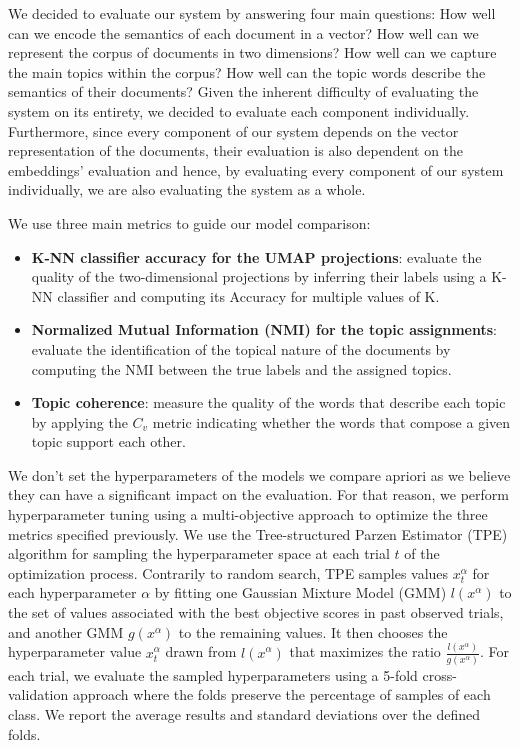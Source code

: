 \documentclass[a4paper]{article}
\begin{document}
We decided to evaluate our system by answering four main questions: How well can we encode the semantics of each document in a vector? How well can we represent the corpus of documents in two dimensions? How well can we capture the main topics within the corpus? How well can the topic words describe the semantics of their documents?
Given the inherent difficulty of evaluating the system on its entirety, we decided to evaluate each component individually. Furthermore, since every component of our system depends on the vector representation of the documents, their evaluation is also dependent on the embeddings' evaluation and hence, by evaluating every component of our system individually, we are also evaluating the system as a whole.

We use three main metrics to guide our model comparison: 
\begin{itemize}
  \item \textbf{K-NN classifier accuracy for the UMAP projections}: evaluate the quality of the two-dimensional projections by inferring their labels using a K-NN classifier and computing its Accuracy for multiple values of K.
  \item \textbf{Normalized Mutual Information (NMI) for the topic assignments}: evaluate the identification of the topical nature of the documents by computing the NMI between the true labels and the assigned topics.
  \item \textbf{Topic coherence}: measure the quality of the words that describe each topic by applying the $C_v$ metric \citep{roder2015} indicating whether the words that compose a given topic support each other.
\end{itemize}

We don't set the hyperparameters of the models we compare apriori as we believe they can have a significant impact on the evaluation. For that reason, we perform hyperparameter tuning using a multi-objective approach to optimize the three metrics specified previously. We use the Tree-structured Parzen Estimator (TPE) algorithm \citep{bergstra2011, ozaki2020} for sampling the hyperparameter space at each trial $t$ of the optimization process. Contrarily to random search, TPE samples values $x_t^\alpha$ for each hyperparameter $\alpha$ by fitting one Gaussian Mixture Model (GMM) $l(x^\alpha)$ to the set of values associated with the best objective scores in past observed trials, and another GMM $g(x^\alpha)$ to the remaining values. It then chooses the hyperparameter value $x_t^\alpha$ drawn from $l(x^\alpha)$ that maximizes the ratio $\frac{l(x^\alpha)}{g(x^\alpha)}$. For each trial, we evaluate the sampled hyperparameters using a 5-fold cross-validation approach where the folds preserve the percentage of samples of each class. We report the average results and standard deviations over the defined folds.
\end{document}
